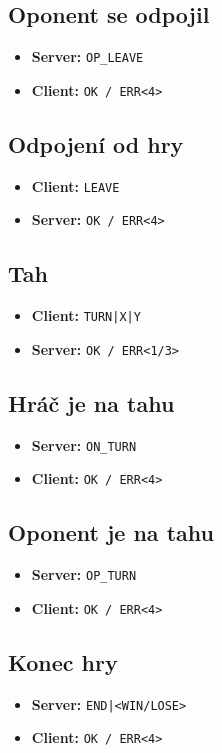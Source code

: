 \documentclass[11pt,a4paper]{article}
\begin{document}
\subsection*{Oponent se odpojil}
\begin{itemize}
	\item \textbf{Server:} \texttt{OP\_LEAVE}
	\item \textbf{Client:} \texttt{OK / ERR<4>}
\end{itemize}

\subsection*{Odpojení od hry}
\begin{itemize}
	\item \textbf{Client:} \texttt{LEAVE}
	\item \textbf{Server:} \texttt{OK / ERR<4>}
\end{itemize}

\subsection*{Tah}
\begin{itemize}
	\item \textbf{Client:} \texttt{TURN|X|Y}
	\item \textbf{Server:} \texttt{OK / ERR<1/3>}
\end{itemize}

\subsection*{Hráč je na tahu}
\begin{itemize}
	\item \textbf{Server:} \texttt{ON\_TURN}
	\item \textbf{Client:} \texttt{OK / ERR<4>}
\end{itemize}

\subsection*{Oponent je na tahu}
\begin{itemize}
	\item \textbf{Server:} \texttt{OP\_TURN}
	\item \textbf{Client:} \texttt{OK / ERR<4>}
\end{itemize}

\subsection*{Konec hry}
\begin{itemize}
	\item \textbf{Server:} \texttt{END|<WIN/LOSE>}
	\item \textbf{Client:} \texttt{OK / ERR<4>}
\end{itemize}
\end{document}

